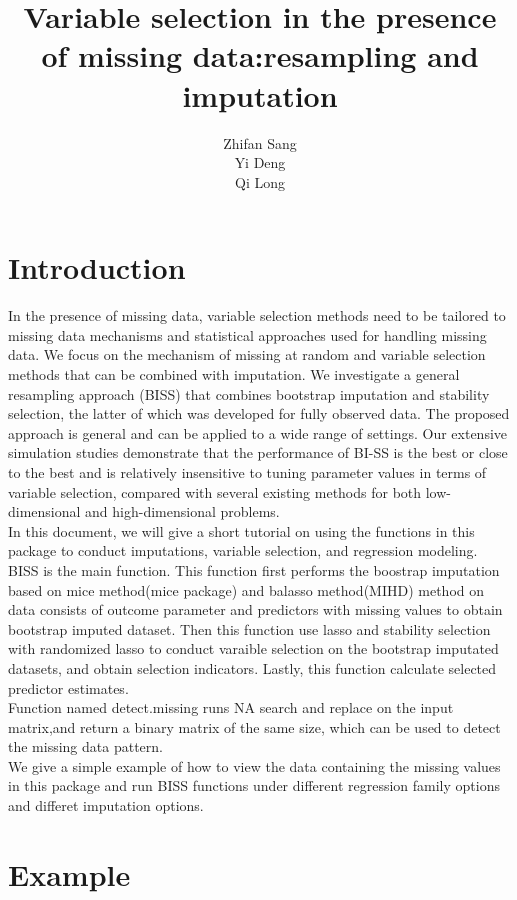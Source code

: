\documentclass[a4paper]{article}
\title{Variable selection in the presence of missing data:resampling and imputation}
\author{Zhifan Sang\\
Yi Deng\\
Qi Long
}
\begin{document}



\maketitle
\section{Introduction}

      In the presence of missing data, variable selection methods need to be tailored to missing data mechanisms
and statistical approaches used for handling missing data. We focus on the mechanism of missing
at random and variable selection methods that can be combined with imputation. We investigate a general
resampling approach (BISS) that combines bootstrap imputation and stability selection, the latter of
which was developed for fully observed data. The proposed approach is general and can be applied to a
wide range of settings. Our extensive simulation studies demonstrate that the performance of BI-SS is the
best or close to the best and is relatively insensitive to tuning parameter values in terms of variable selection,
compared with several existing methods for both low-dimensional and high-dimensional problems.\\

In this document, we will give a short tutorial on using the functions in this
package to conduct imputations, variable selection, and regression modeling. BISS is the main function.
This function first performs the boostrap imputation based on mice method(mice package) and balasso method(MIHD) method on data consists of  
outcome parameter and predictors with missing values to obtain bootstrap imputed dataset.  Then this function use lasso and stability selection with randomized lasso to conduct
varaible selection on the bootstrap imputated datasets, and obtain selection indicators. Lastly, this function calculate selected predictor estimates. \\
Function named detect.missing runs NA search and replace on the input matrix,and return a binary matrix of the same size, which can be used to detect the missing data pattern.\\

We give a simple example of how to view the data containing the missing values in this package
and run BISS functions under different regression family options and differet imputation options.


\section{Example}
\end{document}
